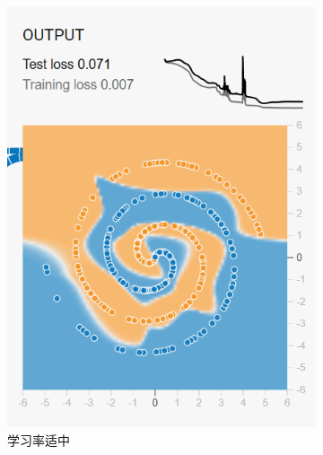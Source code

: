 \documentclass[printMode=false, declarePage=false]{ecnuthesis}
\begin{document}
\begin{figure}[htbp]
\begin{subfigure}[b]{0.3\textwidth}
            \includegraphics[width=\textwidth]{medium-003.png}
            \caption{学习率适中}
            \label{fig:step086}
        \end{subfigure}
        \hfill
        \begin{subfigure}[b]{0.3\textwidth}
            \centering

\end{subfigure}
\end{figure}
\end{document}
